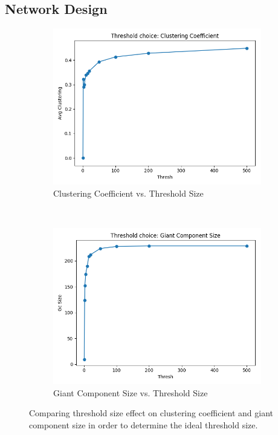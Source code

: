 \subsection{Network Design}

\begin{figure}[t]
    \centering
    \begin{subfigure}{0.4\textwidth}
        \includegraphics[width=1.\textwidth]{images/thresh_vs_avg_clustering.png}
        \caption{Clustering Coefficient vs. Threshold Size}
    \end{subfigure}
    ~
    \begin{subfigure}{0.4\textwidth}
        \includegraphics[width=1.\textwidth]{images/thresh_vs_gc_size.png}
        \caption{Giant Component Size vs. Threshold Size}
    \end{subfigure}
    \caption{Comparing threshold size effect on clustering coefficient and giant component size in order to determine the ideal threshold size.}
    \label{fig-threshold-size}
\end{figure}

